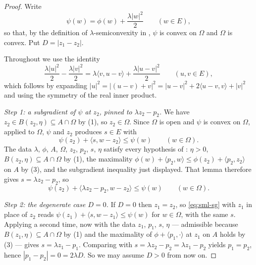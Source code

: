 \begin{proof}
Write
\[
  \psi(w)=\phi(w)+\frac{\lambda|w|^2}{2}\qquad(w\in E),
\]
so that, by the definition of $\lambda$-semiconvexity in
, $\psi$ is convex on $\Omega$ and $\Omega$ is convex.
Put $D=|z_1-z_2|$.

Throughout we use the identity
\begin{equation}\label{eq:sml-quad}
  \frac{\lambda|u|^2}{2}-\frac{\lambda|v|^2}{2}
   =\lambda\langle v,u-v\rangle+\frac{\lambda|u-v|^2}{2}
  \qquad(u,v\in E),
\end{equation}
which follows by expanding $|u|^2=|(u-v)+v|^2=|u-v|^2+2\langle u-v,v\rangle+|v|^2$
and using the symmetry of the real inner product.

\emph{Step 1: a subgradient of $\psi$ at $z_2$, pinned to $\lambda z_2-p_2$.}
We have $z_2\in B(z_2,\eta)\subseteq A\cap\Omega$ by (1), so $z_2\in\Omega$.
Since $\Omega$ is open and $\psi$ is convex on $\Omega$,
 applied to $\Omega$, $\psi$ and $z_2$
produces $s\in E$ with
\[
  \psi(z_2)+\langle s,w-z_2\rangle\le\psi(w)\qquad(w\in\Omega).
\]
The data $\lambda$, $\phi$, $A$, $\Omega$, $z_2$, $p_2$, $s$, $\eta$ satisfy
every hypothesis of : $\eta>0$,
$B(z_2,\eta)\subseteq A\cap\Omega$ by (1), the maximality
$\phi(w)+\langle p_2,w\rangle\le\phi(z_2)+\langle p_2,z_2\rangle$ on $A$ by
(3), and the subgradient inequality just displayed. That lemma therefore gives
$s=\lambda z_2-p_2$, so
\begin{equation}\label{eq:sml-sg}
  \psi(z_2)+\langle\lambda z_2-p_2,w-z_2\rangle\le\psi(w)\qquad(w\in\Omega).
\end{equation}

\emph{Step 2: the degenerate case $D=0$.}
If $D=0$ then $z_1=z_2$, so \eqref{eq:sml-sg} with $z_1$ in place of $z_2$ reads
$\psi(z_1)+\langle s,w-z_1\rangle\le\psi(w)$ for $w\in\Omega$, with the same
$s$. Applying  a second time, now with
the data $z_1$, $p_1$, $s$, $\eta$ --- admissible because
$B(z_1,\eta)\subseteq A\cap\Omega$ by (1) and the maximality of
$\phi+\langle p_1,\cdot\rangle$ at $z_1$ on $A$ holds by (3) --- gives
$s=\lambda z_1-p_1$. Comparing with $s=\lambda z_2-p_2=\lambda z_1-p_2$ yields
$p_1=p_2$, hence $|p_1-p_2|=0=2\lambda D$. So we may assume $D>0$ from now on.


\end{proof}
